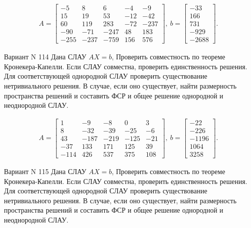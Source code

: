 \documentclass[11pt]{report}
\begin{document}
\begin{align*}
 A = \left[\begin{matrix}-5 & 8 & 6 & -4 & -9\\15 & 19 & 53 & -12 & -42\\60 & 119 & 283 & -72 & -237\\-90 & -71 & -247 & 48 & 183\\-255 & -237 & -759 & 156 & 576\end{matrix}\right],
\ b = \left[\begin{matrix}-33\\166\\731\\-929\\-2688\end{matrix}\right]. 
 \end{align*}

Вариант N 114
Дана СЛАУ $AX = b$,
Проверить совместность по теореме Кронекера-Капелли. Если СЛАУ совместна, проверить единственность решения.
Для соответствующей однородной СЛАУ проверить существование нетривиального решения. В случае, если оно существует,
найти размерность пространства решений и составить ФСР и общее решение однородной  и неоднородной СЛАУ.


\begin{align*}
 A = \left[\begin{matrix}1 & -9 & -8 & 0 & 3\\8 & -32 & -39 & -25 & -6\\43 & -187 & -219 & -125 & -21\\-37 & 133 & 171 & 125 & 39\\-114 & 426 & 537 & 375 & 108\end{matrix}\right],
\ b = \left[\begin{matrix}-22\\-226\\-1196\\1064\\3258\end{matrix}\right]. 
 \end{align*}

Вариант N 115
Дана СЛАУ $AX = b$,
Проверить совместность по теореме Кронекера-Капелли. Если СЛАУ совместна, проверить единственность решения.
Для соответствующей однородной СЛАУ проверить существование нетривиального решения. В случае, если оно существует,
найти размерность пространства решений и составить ФСР и общее решение однородной  и неоднородной СЛАУ.
\end{document}

